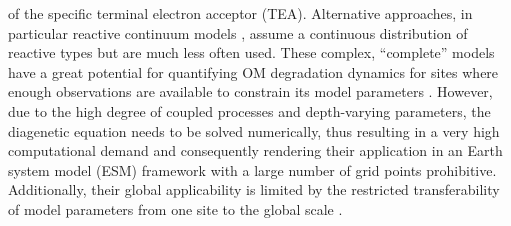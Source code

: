\documentclass[gmd, manuscript]{copernicus}
\begin{document}
of the specific terminal electron acceptor (TEA). 
Alternative approaches, in particular reactive continuum models \citep{boudreau_reactive_1991}, assume a continuous distribution of reactive types but are much less often used. 
These complex, ``complete'' models have a great potential for quantifying OM degradation dynamics for sites where enough observations are available to constrain its model 
parameters \citep[see e.g.][for applications]{boudreau_comparative_1998, wang_multicomponent_1996, thullner_global_scale_2009}. 
However, due to the high degree of coupled processes and depth-varying parameters, the diagenetic equation needs to be %
solved numerically, thus resulting in a very high computational demand and consequently rendering their application in an Earth system model (ESM) framework with a large number of grid points prohibitive. 
Additionally, their global applicability is limited by the restricted transferability of model parameters from one site to the global scale \citep{arndt_quantifying_2013}. 
\end{document}
